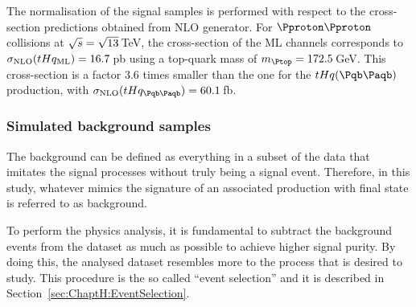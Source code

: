 The normalisation of the \tHq signal samples is performed with respect to the
cross-section predictions obtained from NLO generator. 
For $\Pproton \Pproton$ collisions at
$\sqrt{s} = \sqrt{13}\,$TeV, the cross-section of the ML channels 
corresponds to $\sigma_{\text{NLO}} (tHq_{\text{ML}})= 16.7\,$pb
using a top-quark mass of $\mtop =172.5\,$GeV. %
This cross-section is a factor 3.6 times smaller than the one for the $\tHq(\bbbar)$ production, 
with $\sigma_{\text{NLO}} (\tHq_{\bbbar})= 60.1\,$fb. 


\subsubsection{Simulated background samples}
\label{sec:ChaptH:Data_and_MC:MC:Bkg}
The background can be defined as everything in a subset of the data that 
imitates the signal processes without truly being a signal event.  Therefore, 
in this study, whatever mimics the signature of an associated \tHq production 
with  \dileptau final state is referred to as background. 

To perform the physics analysis, it is fundamental to subtract the background events from the dataset
as much as possible to achieve higher signal purity.
By doing this, the analysed dataset resembles more to the process that is desired to study.
This procedure is the so called ``event selection'' and it is described in Section~\ref{sec:ChaptH:EventSelection}.

\begin{comment} %
In our analysis, background events are classified into two distinct types:  
``reducible'' backgrounds and ``irreducible'' backgrounds.

Reducible backgrounds refer to situations where particles in the event 
simulation mimic the characteristics of the particles we are specifically 
interested in. For example, a high-energy electron can produce a signature 
that closely resembles that of a high-energy photon, leading to misidentification.

On the other hand, irreducible backgrounds involve physical objects that are of 
the same nature as the particles we are targeting. These backgrounds cannot be 
easily distinguished from our signal events based on their properties alone.

In the \dileptau channel, the dominant backgrounds consist of reducible events 
where jets misidentified as \tauhad are present. This is particularly observed in 
the \ttbar and \Zjets backgrounds. Additionally, other backgrounds include processes 
involving dibosons (VV) and \ttX production, such 
as \ttH, \ttZ, and \ttW.
\end{comment}


